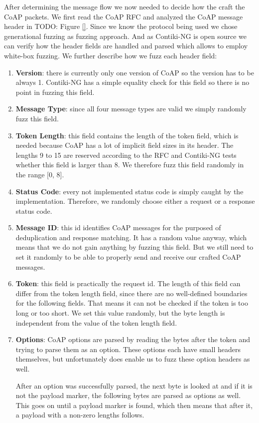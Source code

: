 After determining the message flow we now needed to decide how the craft the CoAP packets. We first read the CoAP RFC and analyzed the CoAP message header in TODO: Figure \ref{}. Since we know the protocol being used we chose generational fuzzing as fuzzing approach. And as Contiki-NG is open source we can verify how the header fields are handled and parsed which allows to employ white-box fuzzing. We further describe how we fuzz each header field:
\begin{enumerate}
	\item \textbf{Version}: there is currently only one version of CoAP so the version has to be always 1. Contiki-NG has a simple equality check for this field so there is no point in fuzzing this field.
	\item \textbf{Message Type}: since all four message types are valid we simply randomly fuzz this field.
	\item \textbf{Token Length}: this field contains the length of the token field, which is needed because CoAP has a lot of implicit field sizes in its header. The lengths 9 to 15 are reserved according to the RFC and Contiki-NG tests whether this field is larger than 8. We therefore fuzz this field randomly in the range [0, 8].
	\item \textbf{Status Code}: every not implemented status code is simply caught by the implementation. Therefore, we randomly choose either a request or a response status code.
	\item \textbf{Message ID}: this id identifies CoAP messages for the purposed of deduplication and response matching. It has a random value anyway, which means that we do not gain anything by fuzzing this field. But we still need to set it randomly to be able to properly send and receive our crafted CoAP messages.
	\item \textbf{Token}: this field is practically the request id. The length of this field can differ from the token length field, since there are no well-defined boundaries for the following fields. That means it can not be checked if the token is too long or too short. We set this value randomly, but the byte length is independent from the value of the token length field.
	\item \textbf{Options}: CoAP options are parsed by reading the bytes after the token and trying to parse them as an option. These options each have small headers themselves, but unfortunately \scapy does enable us to fuzz these option headers as well.

	After an option was successfully parsed, the next byte is looked at and if it is not the payload marker, the following bytes are parsed as options as well. This goes on until a payload marker is found, which then means that after it, a payload with a non-zero lengths follows.


\end{enumerate}
